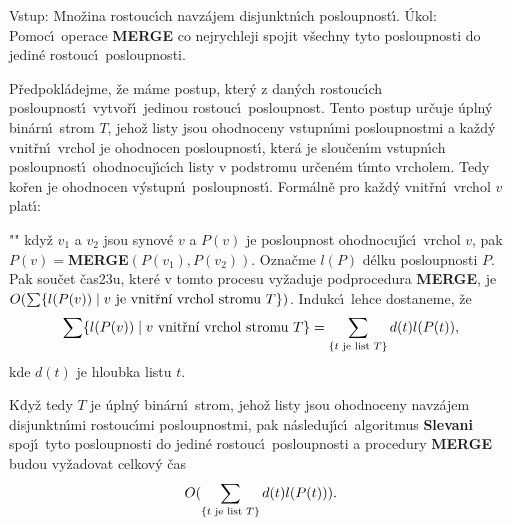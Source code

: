 \documentclass[a4paper,12pt]{article}
\begin{document}
\flushpar Vstup: Mno\v zina rostouc\'\i ch navz\'ajem 
disjunktn\'\i ch posloupnost\'\i .\newline 
\'Ukol:  Pomoc\'\i\ operace {\bf MERGE} co nejrychleji spojit 
v\v sechny tyto posloupnosti do jedin\'e rostouc\'\i\ posloupnosti.  
\medskip

\flushpar P\v redpokl\'adejme, \v ze m\'ame postup, kter\'y z 
dan\'ych rostouc\'\i ch posloupnost\'\i\ vytvo\v r\'\i\ 
jedinou rostouc\'\i\ po\-sloupnost. Tento postup ur\v cuje \'upln\'y 
bin\'arn\'\i\ strom $T$, jeho\v z listy jsou ohodnoceny vstupn\'\i mi 
posloupnostmi a ka\v zd\'y vnit\v rn\'\i\ vr\-chol je ohodnocen 
posloupnost\'\i , kter\'a je slou\v cen\'\i m vstupn\'\i ch posloupnost\'\i\ 
ohodnocuj\'\i c\'\i ch listy v podstromu ur\v cen\'em t\'\i mto 
vr\-cholem. Tedy ko\v ren je ohodnocen v\'ystupn\'\i\ posloupnost\'\i . 
Form\'aln\v e pro ka\v zd\'y vnit\v rn\'\i\ vr\-chol  $v$ plat\'\i :
\roster
\item"{}"
kdy\v z  $v_1$ a $v_2$ jsou synov\'e $v$ a $P(v)$ je posloupnost 
ohodnocuj\'\i c\'\i\ vrchol $v$,  pak\newline 
$P(v)=${\bf MERGE$(P(v_1),P(v_2))$}.
\endroster
Ozna\v cme $l(P)$ d\'elku posloupnosti $P$. Pak sou\v cet 
\v cas\accent23u, kter\'e v tomto procesu vy\v zaduje 
podprocedura {\bf MERGE},
je $O(\sum \{l(P(v))\mid v\text{\rm \ je vnit\v rn\'\i\ vrchol stromu }
T\})$. Indukc\'\i\ 
lehce dostaneme, \v ze 
$$\sum \{l(P(v))\mid v\text{\rm \ vnit\v rn\'\i\ vrchol stromu }T
\}=\sum_{\{t\text{\rm \ je list }T\}}d(t)l(P(t)),$$
kde $d(t)$ je hloubka listu $t$.
\medskip

\flushpar Kdy\v z tedy $T$ je \'upln\'y bin\'arn\'\i\ strom, jeho\v z listy
jsou ohodnoceny navz\'ajem disjunktn\'\i mi rostouc\'\i mi  
posloupnostmi, pak n\'asleduj\'\i c\'\i\ algoritmus {\bf Slevani} spoj\'\i\ tyto  
posloupnosti do jedin\'e rostouc\'\i\ posloupnosti a procedury 
{\bf MERGE} budou vy\v zadovat celkov\'y \v cas 
$$O(\sum_{\{t\text{\rm \ je list }T\}}d(t)l(P(t))).$$
\bigskip
\end{document}
